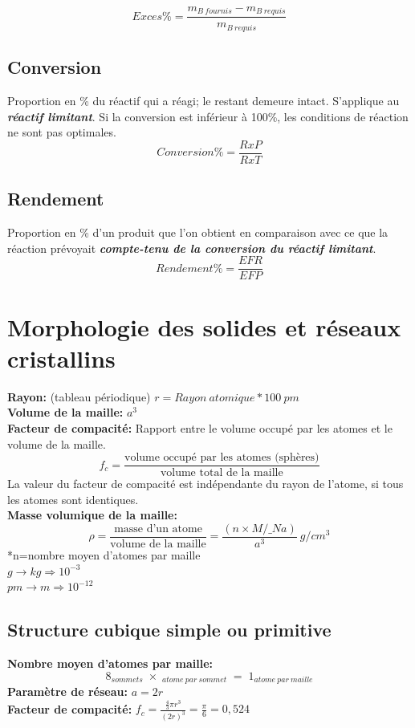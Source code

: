 \documentclass[twocolumn,letterpaper,8pt]{extarticle}
\begin{document}
$$Exces\%=\frac{m_{B\ fournis} - m_{B\ requis}}{m_{B\ requis}}$$

\subsection{Conversion}

Proportion en \% du réactif qui a réagi; le restant demeure intact. S'applique au \textbf{\textit{réactif limitant}}. Si la conversion est inférieur à 100\%, les conditions de réaction ne sont pas optimales.
$$Conversion\%=\frac{RxP}{RxT}$$

\subsection{Rendement}
Proportion en \% d'un produit que l'on obtient en comparaison avec ce que la réaction prévoyait \textbf{\textit{compte-tenu de la conversion du réactif limitant}}.
$$Rendement\%=\frac{EFR}{EFP}$$


\section{Morphologie des solides et réseaux cristallins}
\textbf{Rayon:} (tableau périodique) $r = Rayon\ atomique * 100\ pm$\\

\textbf{Volume de la maille:} $a^3$\\

\textbf{Facteur de compacité:}
Rapport entre le volume occupé par les atomes et le volume de la maille.
$$f_c=\frac{\textrm{volume occupé par les atomes (sphères)}}{\textrm{volume total de la maille}}$$
{\footnotesize *La valeur du facteur de compacité est indépendante du rayon de l’atome, si tous les atomes sont identiques.}\\

\textbf{Masse volumique de la maille:}
$$\rho = \frac{\textrm{masse d'un atome}}{\textrm{volume de la maille}} = \frac{(n \times M/\_Na)}{a^3}\ g/cm^3$$
{\footnotesize
*n=nombre moyen d'atomes par maille\\
$g \rightarrow kg \Rightarrow 10^{-3}$\\
$pm \rightarrow m \Rightarrow 10^{-12}$
}

\subsection{Structure cubique simple ou primitive}
\textbf{Nombre moyen d'atomes par maille:}
$$\mathop{8}_{sommets} \times \mathop{\frac{1}{8}}_{atome\ par\ sommet} = \mathop{1}_{atome\ par\ maille}$$
\textbf{Paramètre de réseau:} $a=2r$\\
\textbf{Facteur de compacité:} $f_c=\frac{\frac{4}{3}\pi r^3}{(2r)^3}=\frac{\pi}{6}=0,524$
\end{document}
